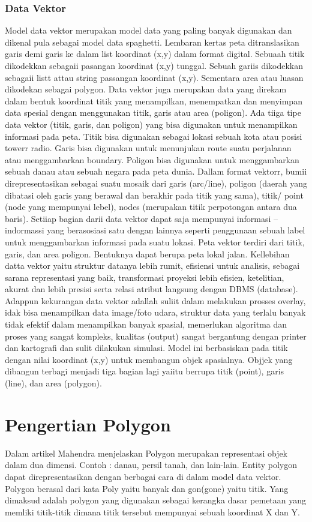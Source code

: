 \subsubsection{Data Vektor}
Model data vektor merupakan model data yang paling banyak digunakan dan dikenal pula sebagai model data spaghetti. Lembaran kertas peta ditranslasikan garis demi garis ke dalam list koordinat (x,y) dalam format digital. Sebuaah titik dikodekkan sebagaii pasangan koordinat (x,y) tunggal. Sebuah gariis dikodekkan sebagaii listt attau string passangan koordinat (x,y). Sementara area atau luasan dikodekan sebagai polygon. Data vektor juga merupakan data yang direkam dalam bentuk koordinat titik yang menampilkan, menempatkan dan menyimpan data spesial dengan menggunakan titik, garis atau area (poligon). Ada tiiga tipe data vektor (titik, garis, dan poligon) yang bisa digunakan untuk menampilkan informasi pada peta. Titik bisa digunakan sebagai lokasi sebuah kota atau posisi towerr radio. Garis bisa digunakan untuk menunjukan route suatu perjalanan atau menggambarkan boundary. Poligon bisa digunakan untuk menggambarkan sebuah danau atau sebuah negara pada peta dunia. Dallam format vektorr, bumii direpresentasikan sebagai suatu mosaik dari garis (arc/line), poligon (daerah yang dibatasi oleh garis yang berawal dan berakhir pada titik yang sama), titik/ point (node yang mempunyai lebel), nodes (merupakan titik perpotongan antara dua baris). Setiiap bagian darii data vektor dapat saja mempunyai informasi – indormassi yang berasosiasi satu dengan lainnya seperti penggunaan sebuah label untuk menggambarkan informasi pada suatu lokasi. Peta vektor terdiri dari titik, garis, dan area poligon. Bentuknya dapat berupa peta lokal jalan. Kellebihan datta vektor yaitu struktur datanya lebih rumit, efisiensi untuk analisis, sebagai sarana representasi yang baik, transformasi proyeksi lebih efisien, ketelitian, akurat dan lebih presisi serta relasi atribut langsung dengan DBMS (database). Adappun kekurangan data vektor adallah suliit dalam melakukan prosses overlay, idak bisa menampilkan data image/foto udara, struktur data yang terlalu banyak tidak efektif dalam menampilkan banyak spasial, memerlukan algoritma dan proses yang sangat kompleks, kualitas (output) sangat bergantung dengan printer dan kartografi dan sulit dilakukan simulasi.
Model ini berbasiskan pada titik dengan nilai koordinat (x,y) untuk membangun objek spasialnya. Objjek yang dibangun terbagi menjadi tiga bagian lagi yaiitu berrupa titik (point), garis (line), dan area (polygon).


\section{Pengertian Polygon}
Dalam artikel Mahendra menjelaskan Polygon merupakan representasi objek dalam dua dimensi. Contoh : danau,
persil tanah, dan lain-lain. Entity polygon dapat direpresentasikan dengan berbagai cara di dalam model data vektor. 
Polygon berasal dari kata Poly yaitu banyak dan gon(gone) yaitu titik. Yang dimaksud adalah polygon yang digunakan sebagai kerangka dasar pemetaan yang memliki titik-titik dimana titik tersebut mempunyai sebuah koordinat X dan Y. 

